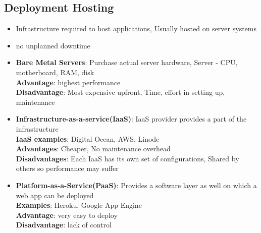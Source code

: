 \documentclass[a4paper]{article}
\begin{document}
\subsection{Deployment Hosting}
\begin{itemize}
    \item Infrastructure required to host applications, Usually hosted on server systems
    \item no unplanned downtime
    \item \textbf{Bare Metal Servers}: Purchase actual server hardware, Server - CPU, motherboard, RAM, disk\\
    \textbf{Advantage}: highest performance\\
    \textbf{Disadvantage}: Most expensive upfront, Time, effort in setting up, maintenance
    \item \textbf{Infrastructure-as-a-service(IaaS)}: IaaS provider provides a part of the infrastructure\\
    \textbf{IaaS examples}: Digital Ocean, AWS, Linode\\
    \textbf{Advantages}: Cheaper, No maintenance overhead\\
    \textbf{Disadvantages}: Each IaaS has its own set of configurations, Shared by others so performance may suffer
    \item \textbf{Platform-as-a-Service(PaaS)}: Provides a software layer as well on which a web app can be deployed\\
    \textbf{Examples}: Heroku, Google App Engine\\
    \textbf{Advantage}: very easy to deploy \\
    \textbf{Disadvantage}: lack of control
\end{itemize}
\end{document}
